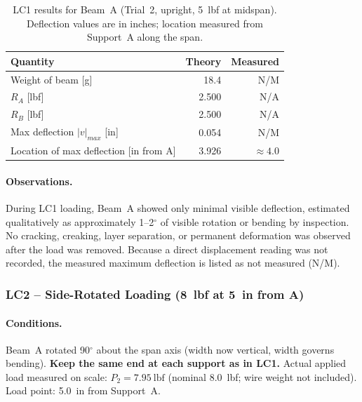 \documentclass[11pt,letterpaper]{article}
\begin{document}
\begin{table}[H]
\centering
\caption{LC1 results for Beam~A (Trial~2, upright, 5~lbf at midspan).
Deflection values are in inches; location measured from Support~A along the span.}
\label{tab:testA_lc1}
\begin{tabular}{lrr}
\toprule
Quantity & Theory & Measured \\
\midrule
Weight of beam [g]            & 18.4  & N/M \\
$R_A$ [lbf]                   & 2.500 & N/A \\
$R_B$ [lbf]                   & 2.500 & N/A \\
Max deflection $|v|_{max}$ [in] & 0.054 & N/M \\
Location of max deflection [in from A] & 3.926 & $\approx 4.0$ \\
\bottomrule
\end{tabular}
\end{table}

\paragraph{Observations.}
During LC1 loading, Beam~A showed only minimal visible deflection, estimated
qualitatively as approximately 1--2$^\circ$ of visible rotation or bending by
inspection.  No cracking, creaking, layer separation, or permanent deformation
was observed after the load was removed.  Because a direct displacement reading
was not recorded, the measured maximum deflection is listed as not measured
(N/M).

\subsubsection{LC2 -- Side-Rotated Loading (8~lbf at 5~in from A)}

\paragraph{Conditions.}
Beam~A rotated 90$^\circ$ about the span axis (width now vertical, width governs bending).
\textbf{Keep the same end at each support as in LC1.}
Actual applied load measured on scale: $P_2 = 7.95\ \mathrm{lbf}$
(nominal 8.0~lbf; wire weight not included).
Load point: 5.0~in from Support~A.
\end{document}
